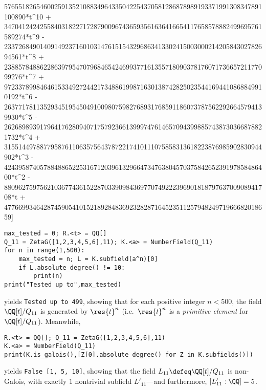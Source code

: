 \documentclass[12pt]{report}
\begin{document}
576551826546002591352108834964335042254370581286878989193371991308347891100890*t^10 + 347041242425584031822717287900967436593561636416654117658578882499695761589274*t^9 - 23372684901409149237160103147615154329686341330241500300021420584302782694561*t^8 + 23885784886228639795470796846542469937716135571809037817607173665721177099276*t^7 + 9723378998464615334927244217348861998716301387428250235441694410868849910192*t^6 - 2637717811352934519545049100980759827689317685911860737875622926645794139930*t^5 - 2626898939179641762809407175792366139997476146570943998857438730366878821732*t^4 + 315514497887795876110635756437872217410111075858313618223876985902830944902*t^3 - 42439587405788488652253167120396132966473476380457037584265239197858486400*t^2 - 88096275975621036774361522870339098436977074922239690181879763700908941708*t + 47766993464287459054101521892848369232828716452351125794824971966682018659]
\begin{verbatim}
max_tested = 0; R.<t> = QQ[]
Q_11 = ZetaG([1,2,3,4,5,6],11); K.<a> = NumberField(Q_11)
for n in range(1,500):
    max_tested = n; L = K.subfield(a^n)[0]
    if L.absolute_degree() != 10:
        print(n)
print("Tested up to",max_tested)
\end{verbatim}
yields
\verb!Tested up to 499!,
showing that for each positive integer $n<500$,
the field $\QQ[t]/Q_{11}$ is generated by $\res{t}^n$
(i.e.~$\res{t}^n$ is a \emph{primitive element} for $\QQ[t]/Q_{11}$).
Meanwhile,
\begin{verbatim}
R.<t> = QQ[]; Q_11 = ZetaG([1,2,3,4,5,6],11)
K.<a> = NumberField(Q_11)
print(K.is_galois(),[Z[0].absolute_degree() for Z in K.subfields()])
\end{verbatim}
yields
\verb!False [1, 5, 10]!,
showing that
the field $L_{11}\defeq\QQ[t]/Q_{11}$ is non-Galois,
with exactly $1$ nontrivial subfield $L'_{11}$---and furthermore,
$[L'_{11}:\QQ]=5$.
\end{document}
